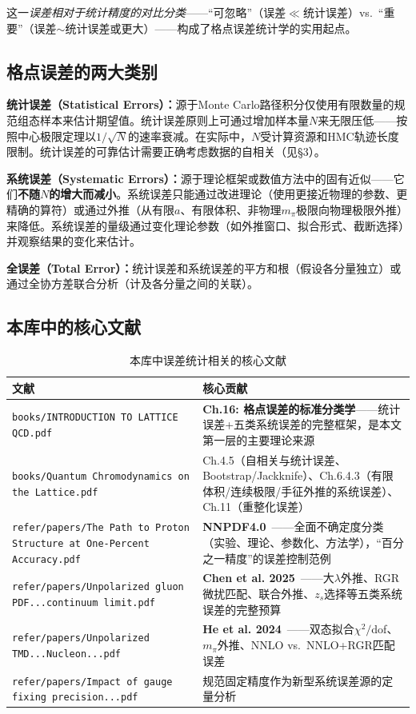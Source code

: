 \documentclass[12pt,a4paper]{ctexart}
\begin{document}
这一\emph{误差相对于统计精度的对比分类}——``可忽略''（误差$\ll$统计误差）vs.\ ``重要''（误差$\sim$统计误差或更大）——构成了格点误差统计学的实用起点。

\subsection{格点误差的两大类别}

\textbf{统计误差（Statistical Errors）：}源于Monte Carlo路径积分仅使用有限数量的规范组态样本来估计期望值。统计误差原则上可通过增加样本量$N$来无限压低——按照中心极限定理以$1/\sqrt{N}$的速率衰减。在实际中，$N$受计算资源和HMC轨迹长度限制。统计误差的可靠估计需要正确考虑数据的自相关（见§3）。

\textbf{系统误差（Systematic Errors）：}源于理论框架或数值方法中的固有近似——它们\textbf{不随$N$的增大而减小}。系统误差只能通过改进理论（使用更接近物理的参数、更精确的算符）或通过外推（从有限$a$、有限体积、非物理$m_\pi$极限向物理极限外推）来降低。系统误差的量级通过变化理论参数（如外推窗口、拟合形式、截断选择）并观察结果的变化来估计。

\textbf{全误差（Total Error）：}统计误差和系统误差的平方和根（假设各分量独立）或通过全协方差联合分析（计及各分量之间的关联）。

\subsection{本库中的核心文献}

\begin{table}[H]
\centering
\caption{本库中误差统计相关的核心文献}
\label{tab:err_papers}
\small
\begin{tabular}{lp{9cm}}
\toprule
\textbf{文献} & \textbf{核心贡献} \\
\midrule
\texttt{books/INTRODUCTION TO LATTICE QCD.pdf}~\cite{Gupta1997intro} &
\textbf{Ch.16: 格点误差的标准分类学}——统计误差+五类系统误差的完整框架，是本文第一层的主要理论来源 \\
\texttt{books/Quantum Chromodynamics on the Lattice.pdf}~\cite{GattringerLang2010} &
Ch.4.5（自相关与统计误差、Bootstrap/Jackknife）、Ch.6.4.3（有限体积/连续极限/手征外推的系统误差）、Ch.11（重整化误差） \\
\texttt{refer/papers/The Path to Proton Structure at One-Percent Accuracy.pdf} &
\textbf{NNPDF4.0}~\cite{NNPDF2021}——全面不确定度分类（实验、理论、参数化、方法学），``百分之一精度''的误差控制范例 \\
\texttt{refer/papers/Unpolarized gluon PDF...continuum limit.pdf} &
\textbf{Chen et al. 2025}~\cite{Chen2025gluon}——大$\lambda$外推、RGR微扰匹配、联合外推、$z_s$选择等五类系统误差的完整预算 \\
\texttt{refer/papers/Unpolarized TMD...Nucleon...pdf} &
\textbf{He et al. 2024}~\cite{He2024unpolTMD}——双态拟合$\chi^2/$dof、$m_\pi$外推、NNLO vs.\ NNLO+RGR匹配误差 \\
\texttt{refer/papers/Impact of gauge fixing precision...pdf} &
规范固定精度作为新型系统误差源的定量分析~\cite{Zhang2024gauge_fixing} \\
\bottomrule
\end{tabular}
\end{table}
\end{document}
